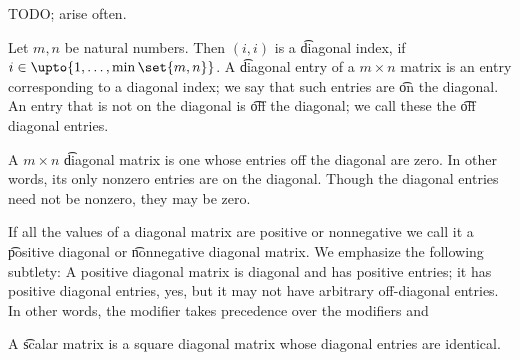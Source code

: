 
\sbasic


























\sstart
{}



TODO;
arise often.


Let $m, n$ be natural numbers.
Then $(i, i)$ is a \t{diagonal index}, if $i \in \upto{1, \dots, \min\set{m, n}}$.
A \t{diagonal entry} of a $m \times n$ matrix is an entry corresponding to a diagonal index; we say that such entries are \t{on the diagonal}.
An entry that is not on the diagonal is \t{off the diagonal}; we call these the \t{off diagonal entries}.

A $m \times n$ \t{diagonal} matrix is one whose entries off the diagonal are zero.
In other words, its only nonzero entries are on the diagonal.
Though the diagonal entries need not be nonzero, they may be zero.

If all the values of a diagonal matrix are positive or nonnegative we call it a \t{positive diagonal} or \t{nonnegative diagonal} matrix.
We emphasize the following subtlety: A positive diagonal matrix is diagonal and has positive entries; it has positive diagonal entries, yes, but it may not have arbitrary off-diagonal entries.
In other words, the modifier  takes precedence over the modifiers  and 

A \t{scalar} matrix is a square diagonal matrix whose diagonal entries are identical.
\strats
